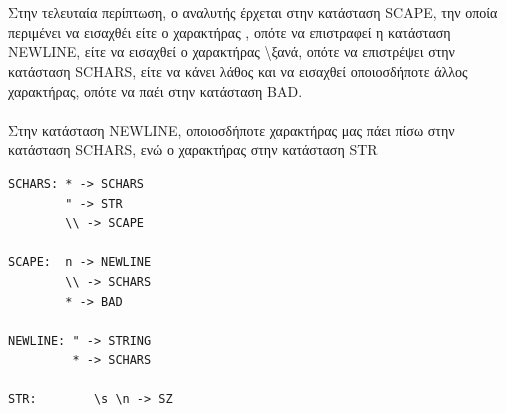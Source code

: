 \documentclass[14pt]{extarticle}
\begin{document}
\\
\\
Στην τελευταία περίπτωση, ο αναλυτής έρχεται στην κατάσταση \textlatin{SCAPE}, την οποία περιμένει να εισαχθέι είτε ο χαρακτήρας , οπότε να επιστραφεί η κατάσταση \textlatin{NEWLINE}, είτε να εισαχθεί ο χαρακτήρας \textbackslash  ξανά, οπότε να επιστρέψει στην κατάσταση \textlatin{SCHARS}, είτε να κάνει λάθος και να εισαχθεί οποιοσδήποτε άλλος χαρακτήρας, οπότε να παέι στην κατάσταση \textlatin{BAD}.  
\\
\\
Στην κατάσταση \textlatin{NEWLINE}, οποιοσδήποτε χαρακτήρας μας πάει πίσω στην κατάσταση \textlatin{SCHARS}, ενώ ο χαρακτήρας  στην κατάσταση \textlatin{STR}
\\
    \begin{lstlisting}
SCHARS: * -> SCHARS
        " -> STR
        \\ -> SCAPE

SCAPE:  n -> NEWLINE
        \\ -> SCHARS
        * -> BAD

NEWLINE: " -> STRING
         * -> SCHARS 

STR:        \s \n -> SZ
    \end{lstlisting}
\end{document}
